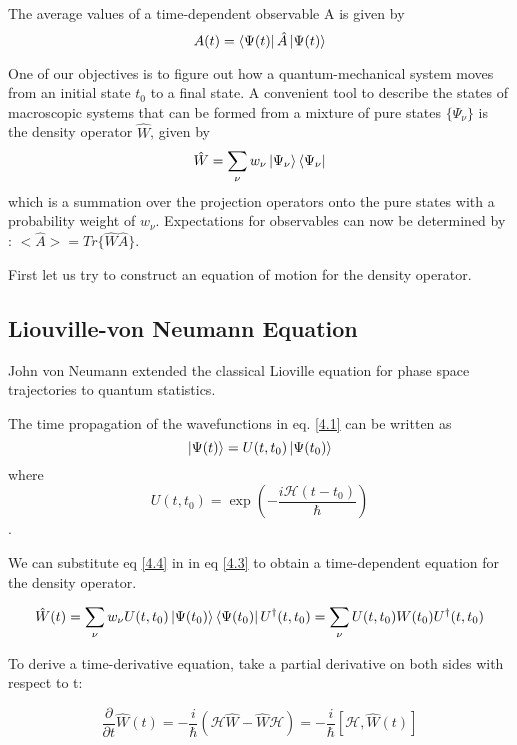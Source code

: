 The average values of a time-dependent observable A is given by \begin{equation} \label{4.2} A(t) = \bra{\Psi(t)} \hat{A} \ket{\Psi(t)} \end{equation}

One of our objectives is to figure out how a quantum-mechanical system moves from an initial state $t_0$ to a final state. A convenient tool to describe the states of macroscopic systems that can be formed from a mixture of pure states $\{ \Psi_{\nu} \}$ is the density operator $\hat{W}$, given by \begin{equation} \label{4.3} \hat{W} = \sum_{\nu} w_{\nu} \ket{\Psi_{\nu}} \bra{\Psi_{\nu}} \end{equation}which is a summation over the projection operators onto the pure states with a probability weight of $w_{\nu}$. Expectations for observables can now be determined by : $<\hat{A}> = Tr\{ \hat{W} \hat{A}\}$.

First let us try to construct an equation of motion for the density operator. 

\subsection{Liouville-von Neumann Equation}

John von Neumann extended the classical Lioville equation for phase space trajectories to quantum statistics.

The time propagation of the wavefunctions in eq. \ref{4.1} can be written as \begin{equation} \label{4.4} \ket{\Psi(t)} = U(t, t_0) \ket{\Psi(t_0)} \end{equation} where $$U(t, t_0) = \exp(-\frac{i \mathcal{H}(t - t_0)}{\hbar})$$.

We can substitute eq \ref{4.4} in in eq \ref{4.3} to obtain a time-dependent equation for the density operator.

\begin{equation} \label{4.5}
    \hat{W}(t) = \sum_{\nu} w_{\nu} U(t, t_0) \ket{\Psi(t_0)} \bra{\Psi(t_0)} U^{\dag}(t, t_0) = \sum_{\nu} U(t, t_0) W(t_0) U^{\dag}(t, t_0)
\end{equation}

To derive a time-derivative equation, take a partial derivative on both sides with respect to t:

\begin{equation} \label{4.6}
    \frac{\partial}{\partial t} \hat{W}(t) = -\frac{i}{\hbar}(\mathcal{H} \hat{W} - \hat{W} \mathcal{H}) = -\frac{i}{\hbar}[\mathcal{H}, \hat{W}(t)]
\end{equation}

